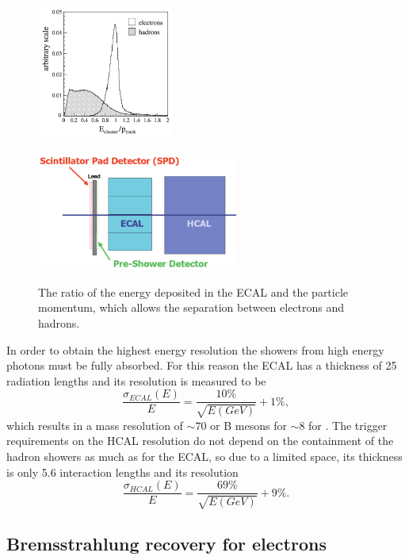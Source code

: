 \begin{figure}[t!]
\centering
\includegraphics[width=0.4\textwidth,height=5.3cm]{Detector/figs/pi0_e_pid_perf.png}
\includegraphics[width=0.59\textwidth]{Detector/figs/calo_layout.png}
\caption{The ratio of the energy deposited in the ECAL and the particle momentum, which allows
the separation between electrons and hadrons. }
\label{fig:pi0_e_pid_perf}
\end{figure}

In order to obtain the highest energy resolution the showers from high energy photons 
must be fully absorbed. For this reason the ECAL has a thickness of 25 radiation lengths and its resolution is 
measured to be~\cite{Alves:2008zz}
 \begin{equation}
 \frac{\sigma_{ECAL}(E)}{E} = \frac{10\%}{\sqrt{E(GeV)}} + 1\%,
 \end{equation}
%
which results in a mass resolution of $\sim 70$ \mevcc or B mesons for $\sim 8$ \mevcc for \piz.
The trigger requirements on the HCAL resolution do not depend on the containment of the hadron showers as much 
as for the ECAL, so due to a limited space, its thickness is only 5.6 interaction lengths and its resolution
%
 \begin{equation}
 \frac{\sigma_{HCAL}(E)}{E} = \frac{69\%}{\sqrt{E(GeV)}} + 9\%.
 \end{equation}

\subsection{Bremsstrahlung recovery for electrons}

